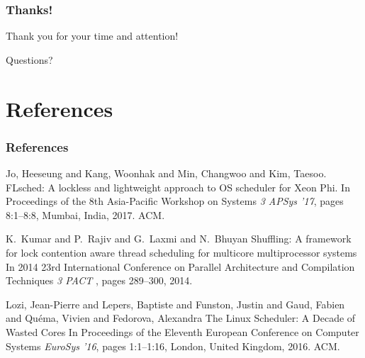 \documentclass{beamer}
\begin{document}
\begin{frame}
\frametitle{Thanks!}

Thank you for your time and attention!

\begin{center}
{\huge Questions?}
\end{center}
\end{frame}

\section*{References}

\begin{frame} 
\frametitle{References} 

\begin{thebibliography}{lskdjf}

Jo, Heeseung and Kang, Woonhak and Min, Changwoo and Kim, Taesoo.
\newblock FLsched: A lockless and lightweight approach to OS scheduler for Xeon Phi.
\newblock In Proceedings of the 8th Asia-Pacific Workshop on Systems {\em3 APSys '17}, pages 8:1--8:8, Mumbai, India, 2017. ACM.

K.~Kumar and P.~Rajiv and G.~Laxmi and N.~Bhuyan
\newblock Shuffling: A framework for lock contention aware thread scheduling for multicore multiprocessor systems
\newblock In 2014 23rd International Conference on Parallel Architecture and Compilation Techniques {\em3 PACT }, pages 289--300, 2014.

  
\end{thebibliography}
\end{frame} 
\begin{frame}

\begin{thebibliography}{lskdjf}

Lozi, Jean-Pierre and Lepers, Baptiste and Funston, Justin and Gaud, Fabien and Qu{\'e}ma, Vivien and Fedorova, Alexandra
\newblock The {Linux} Scheduler: A Decade of Wasted Cores
\newblock In Proceedings of the Eleventh European Conference on Computer Systems {\em EuroSys '16}, pages 1:1--1:16, London, United Kingdom, 2016. ACM.
  
\end{thebibliography}
\end{frame}
\end{document}
